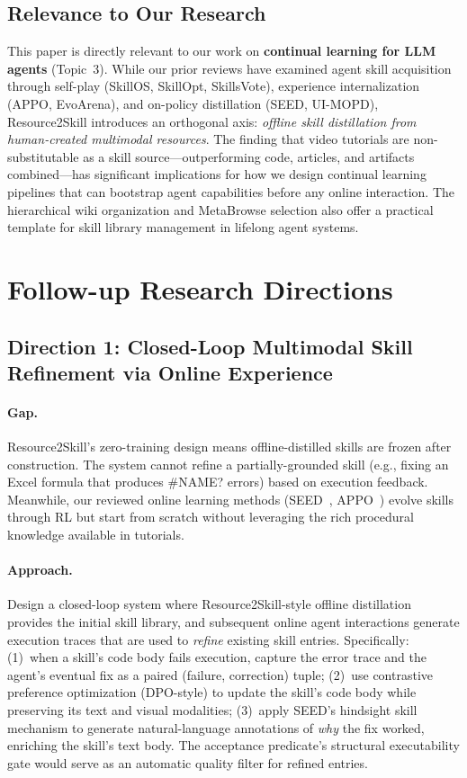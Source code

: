 \documentclass[11pt,a4paper]{article}
\begin{document}
\subsection{Relevance to Our Research}

This paper is directly relevant to our work on \textbf{continual learning for LLM agents} (Topic~3). While our prior reviews have examined agent skill acquisition through self-play (SkillOS, SkillOpt, SkillsVote), experience internalization (APPO, EvoArena), and on-policy distillation (SEED, UI-MOPD), Resource2Skill introduces an orthogonal axis: \emph{offline skill distillation from human-created multimodal resources}. The finding that video tutorials are non-substitutable as a skill source---outperforming code, articles, and artifacts combined---has significant implications for how we design continual learning pipelines that can bootstrap agent capabilities before any online interaction. The hierarchical wiki organization and MetaBrowse selection also offer a practical template for skill library management in lifelong agent systems.

\section{Follow-up Research Directions}

\subsection{Direction 1: Closed-Loop Multimodal Skill Refinement via Online Experience}

\paragraph{Gap.}
Resource2Skill's zero-training design means offline-distilled skills are frozen after construction. The system cannot refine a partially-grounded skill (e.g., fixing an Excel formula that produces \#NAME? errors) based on execution feedback. Meanwhile, our reviewed online learning methods (SEED~\cite{seed2026}, APPO~\cite{appo2026}) evolve skills through RL but start from scratch without leveraging the rich procedural knowledge available in tutorials.

\paragraph{Approach.}
Design a closed-loop system where Resource2Skill-style offline distillation provides the initial skill library, and subsequent online agent interactions generate execution traces that are used to \emph{refine} existing skill entries. Specifically: (1)~when a skill's code body fails execution, capture the error trace and the agent's eventual fix as a paired (failure, correction) tuple; (2)~use contrastive preference optimization (DPO-style) to update the skill's code body while preserving its text and visual modalities; (3)~apply SEED's hindsight skill mechanism to generate natural-language annotations of \emph{why} the fix worked, enriching the skill's text body. The acceptance predicate's structural executability gate would serve as an automatic quality filter for refined entries.
\end{document}
